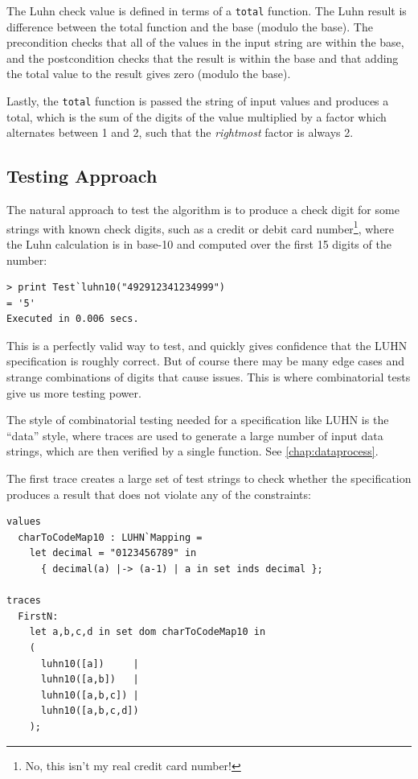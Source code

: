 \documentclass{overturerepchap}
\begin{document}
The Luhn check value is defined in terms of a \texttt{total} function. The
Luhn result is difference between the total function and the base (modulo the
base). The precondition checks that all of the values in the input string are
within the base, and the postcondition checks that the result is within the base
and that adding the total value to the result gives zero (modulo the base).

Lastly, the \texttt{total} function is passed the string of input values and
produces a total, which is the sum of the digits of the value multiplied by a
factor which alternates between 1 and 2, such that the \emph{rightmost}
factor is always 2.

\subsection{Testing Approach}

The natural approach to test the algorithm is to produce a check digit for some
strings with known check digits, such as a credit or debit card
number\footnote{No, this isn't my real credit card number!}, where the Luhn
calculation is in base-10 and computed over the first 15 digits of the number:

\small
\begin{lstlisting}
> print Test`luhn10("492912341234999")
= '5'
Executed in 0.006 secs. 
\end{lstlisting}
\normalsize

This is a perfectly valid way to test, and quickly gives confidence that the
LUHN specification is roughly correct. But of course there may be many edge
cases and strange combinations of digits that cause issues. This is where
combinatorial tests give us more testing power.

The style of combinatorial testing needed for a specification like LUHN is the
``data'' style, where traces are used to generate a large number of input data
strings, which are then verified by a single function. See
\ref{chap:dataprocess}.

The first trace creates a large set of test strings to check whether the
specification produces a result that does not violate any of the constraints:

\small
\begin{lstlisting}
values
  charToCodeMap10 : LUHN`Mapping =
    let decimal = "0123456789" in
      { decimal(a) |-> (a-1) | a in set inds decimal };

traces
  FirstN:
    let a,b,c,d in set dom charToCodeMap10 in
    (
      luhn10([a])     |
      luhn10([a,b])   |
      luhn10([a,b,c]) |
      luhn10([a,b,c,d])
    );
\end{lstlisting}
\normalsize
\end{document}
